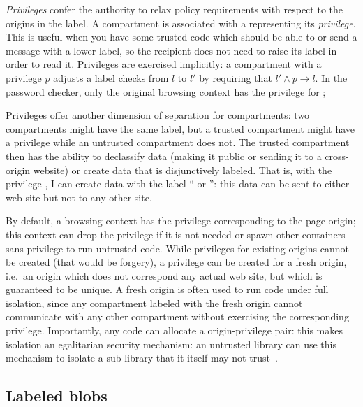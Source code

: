 \emph{Privileges} confer the authority to relax policy requirements with
respect to the origins in the label.
%
A compartment is associated with a  representing its \emph{privilege}.
%
This is useful when you have some trusted code which should be
able to  or send a message with a lower label, so
the recipient does not need to raise its label in order to read it.
%
Privileges are exercised implicitly: a compartment with a privilege $p$
adjusts a label checks from $l$ to $l'$ by requiring that $l' \land p
\rightarrow l$.
%
In the password checker, only the original browsing context has the
privilege for ; 

Privileges offer another dimension of separation for compartments: two
compartments might have the same label, but a trusted compartment might
have a privilege while an untrusted compartment does not.
%
The trusted compartment then has the ability to declassify data (making
it public or sending it to a cross-origin website) or create data
that is disjunctively labeled.
%
That is, with the privilege , I can create data with
the label `` or '': this
data can be sent to either web site but not to any other site.

By default, a browsing context has the privilege corresponding to the
page origin; this context can drop the privilege if it is not
needed or spawn other containers sans privilege to run untrusted code.
%
While privileges for existing origins cannot be created (that would be
forgery), a privilege can be created for a fresh origin, i.e.\ an origin
which does not correspond any actual web site, but which is guaranteed
to be unique.
%
A fresh origin is often used to run code under full isolation, since any
compartment labeled with the fresh origin cannot communicate with any
other compartment without exercising the corresponding privilege.
%
Importantly, any code can allocate a origin-privilege pair: this
makes isolation an egalitarian security mechanism: an untrusted library
can use this mechanism to isolate a sub-library that it itself
may not trust~\cite{Zeldovich:2006}.

\subsection{Labeled blobs}
\label{sec:labeled-blobs}

